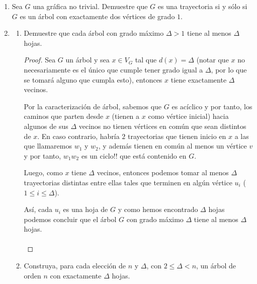 \documentclass{article}
\begin{document}
  \begin{enumerate}
    \item Sea $G$ una gr\'afica no trivial.   Demuestre
      que $G$ es una trayectoria si y s\'olo si $G$ es
      un \'arbol con exactamente dos v\'ertices de
      grado $1$.

    \item \begin{enumerate}
      \item Demuestre que cada \'arbol con grado m\'aximo
        $\Delta > 1$ tiene al menos $\Delta$ hojas.

        \renewcommand\qedsymbol{QED}
        \begin{proof}
          Sea $G$ un \'arbol y sea $x \in V_G$ tal que $d(x) = \Delta$ (notar que $x$
          no necesariamente es el \'unico que cumple tener grado igual a $\Delta$, por
          lo que se tomar\'a alguno que cumpla esto), entonces $x$ tiene exactamente
          $\Delta$ vecinos.

          Por la caracterizaci\'on de \'arbol, sabemos que $G$ es ac\'iclico
          y por tanto, los caminos que parten desde $x$ (tienen a $x$
          como v\'ertice inicial) hacia algunos de sus $\Delta$ vecinos no tienen
          v\'ertices en com\'un que sean distintos de $x$. En caso contrario, habr\'ia $2$
          trayectorias que tienen inicio en $x$ a las que llamaremos $w_1$ y $w_2$, y
          adem\'as tienen en com\'un al menos un v\'ertice $v$ y por tanto, $w_1 w_2$ es
          un ciclo!! que est\'a contenido en $G$.

          Luego, como $x$ tiene $\Delta$ vecinos, entonces podemos tomar al menos
          $\Delta$ trayectorias distintas entre ellas tales que terminen en alg\'un
          v\'ertice $u_i$ ($1 \leq i \leq \Delta$).

          Así, cada $u_i$ es una hoja de $G$ y como hemos encontrado $\Delta$ hojas
          podemos concluir que el \'arbol $G$ con grado m\'aximo $\Delta$ tiene al menos
          $\Delta$ hojas. \\
          \\
        \end{proof}
  \newpage
      \item Construya, para cada elecci\'on de $n$ y $\Delta$,
        con $2\le \Delta < n$, un \'arbol de orden $n$ con
        exactamente $\Delta$ hojas.


\end{enumerate}
\end{enumerate}
\end{document}
